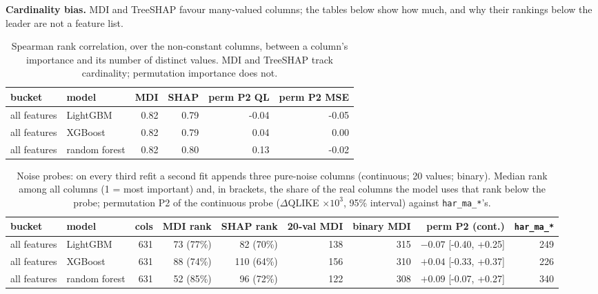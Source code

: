 \documentclass[10pt]{article}
\begin{document}
\textbf{Cardinality bias.} MDI and TreeSHAP favour many-valued columns; the tables below show how much, and why their rankings below the leader are not a feature list.
\begin{table}[H]\centering\footnotesize
\caption{Spearman rank correlation, over the non-constant columns, between a column's importance and its number of distinct values. MDI and TreeSHAP track cardinality; permutation importance does not.}
\begin{tabular}{llrrrr}\toprule
bucket & model & MDI & SHAP & perm P2 QL & perm P2 MSE\\\midrule
all features & LightGBM & 0.82 & 0.79 & -0.04 & -0.05 \\
all features & XGBoost & 0.82 & 0.79 & 0.04 & 0.00 \\
all features & random forest & 0.82 & 0.80 & 0.13 & -0.02 \\
\bottomrule\end{tabular}\end{table}
\begin{table}[H]\centering\scriptsize
\caption{Noise probes: on every third refit a second fit appends three pure-noise columns (continuous; 20 values; binary). Median rank among all columns (1 = most important) and, in brackets, the share of the real columns the model uses that rank below the probe; permutation P2 of the continuous probe ($\Delta$QLIKE $\times 10^{3}$, 95\% interval) against \texttt{har\_ma\_*}'s.}
\begin{tabular}{llrrrrrrr}\toprule
bucket & model & cols & MDI rank & SHAP rank & 20-val MDI & binary MDI & perm P2 (cont.) & \texttt{har\_ma\_*}\\\midrule
all features & LightGBM & 631 & 73 (77\%) & 82 (70\%) & 138 & 315 & $-0.07$ [-0.40, +0.25] & 249 \\
all features & XGBoost & 631 & 88 (74\%) & 110 (64\%) & 156 & 310 & $+0.04$ [-0.33, +0.37] & 226 \\
all features & random forest & 631 & 52 (85\%) & 96 (72\%) & 122 & 308 & $+0.09$ [-0.07, +0.27] & 340 \\
\bottomrule\end{tabular}\end{table}
\end{document}
